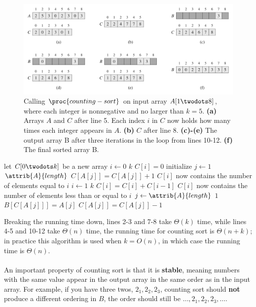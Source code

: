 \documentclass[12pt]{article}
\begin{document}
\begin{figure}[!ht]
\includegraphics[scale=0.45]{counting_sort}
\caption{
    Calling $\proc{counting-sort}$ on input array $A[1 \twodots 8]$, where each integer is nonnegative and no larger than $k=5$.
    \textbf{(a)} Arrays $A$ and $C$ after line 5. Each index $i$ in $C$ now holds how many times each integer appears in $A$. 
    \textbf{(b)} $C$ after line 8.
    \textbf{(c)-(e)} The output array B after three iterations in the loop from lines 10-12.
    \textbf{(f)} The final sorted array B.
}
\label{fig:linear_cs}
\end{figure}

\begin{codebox}
\li let $C[0 \twodots k]$ be a new array
\li \For $i \gets 0$ \To $k$
\li \Do 
        $C[i] = 0$ \Comment initialize
    \End
\li \For $j \gets 1$ \To $\attrib{A}{length}$
\li \Do
        $C[A[j]] = C[A[j]] + 1$
    \End
\li \Comment $C[i]$ now contains the number of elements equal to $i$
\li \For $i \gets 1$ \To $k$
\li \Do
        $C[i] = C[i] + C[i-1]$
    \End
\li \Comment $C[i]$ now contains the number of elements less than or equal to $i$
\li \For $j \gets \attrib{A}{length}$ \Downto $1$
\li \Do
        $B[C[A[j]]] = A[j]$
\li    $C[A[j]] = C[A[j]] - 1$
    \End
\end{codebox}

Breaking the running time down, lines 2-3 and 7-8 take $\Theta{(k)}$ time, while lines 4-5 and 10-12 take $\Theta{(n)}$ time, the running time for counting sort is $\Theta{(n + k)}$; in practice this algorithm is used when $k = O(n)$, in which case the running time is $\Theta{(n)}$.
\\ \\
An important property of counting sort is that it is \textbf{stable}, meaning numbers with the same value appear in the output array in the same order as in the input array. For example, if you have three twos, $2_1, 2_2, 2_3$, counting sort should \textbf{not} produce a different ordering in $B$, the order should still be $\ldots, 2_1, 2_2, 2_3, \ldots$.
\end{document}
